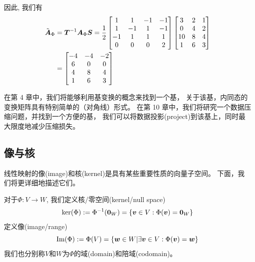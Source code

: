 \begin{example}[基变换]
    因此, 我们有
    \begin{subequations}
        \begin{align}
        \tilde{\boldsymbol{A}}_\Phi &= \boldsymbol{T}^{-1} \boldsymbol{A}_\Phi \boldsymbol{S} =
        \frac{1}{2}
        \begin{bmatrix}
            1 &  1 & -1 & -1 \\
            1 & -1 &  1 & -1 \\
           -1 &  1 &  1 &  1 \\
            0 &  0 &  0 &  2
        \end{bmatrix}
        \begin{bmatrix}
            3 & 2 & 1 \\
            0 & 4 & 2 \\
           10 & 8 & 4 \\
            1 & 6 & 3
        \end{bmatrix}
        \\&=
        \begin{bmatrix}
            -4 & -4 & -2 \\
             6 &  0 &  0 \\
             4 &  8 &  4 \\
             1 &  6 &  3 \\
        \end{bmatrix}
        \end{align}
    \end{subequations}
\end{example}

在第 4 章中，我们将能够利用基变换的概念来找到一个基，
关于该基，内同态的变换矩阵具有特别简单的（对角线）形式。
在第 10 章中，我们将研究一个数据压缩问题，并找到一个方便的基，
我们可以将数据投影(project)到该基上，同时最大限度地减少压缩损失。

\subsection{像与核}

线性映射的像(image)和核(kernel)是具有某些重要性质的向量子空间。
下面，我们将更详细地描述它们。

\begin{definition}[像与核]
    对于$\Phi:V \rightarrow W$, 我们定义核/零空间(kernel/null space)
    \begin{equation}
        \ker(\Phi) := \Phi^{-1}(\boldsymbol{0}_W) =
        \{
            \boldsymbol{v} \in V : \Phi(\boldsymbol{v}) = \boldsymbol{0}_W
        \}
    \end{equation}
    定义像(image/range)
    \begin{equation}
        \mathrm{Im}(\Phi) := \Phi(V) =
        \{
            \boldsymbol{w} \in W |
            \exists \boldsymbol{v} \in V :
            \Phi(\boldsymbol{v}) = \boldsymbol{w}
        \}
    \end{equation}
    我们也分别称$V$和$W$为$\Phi$的域(domain)和陪域(codomain)。
\end{definition}

